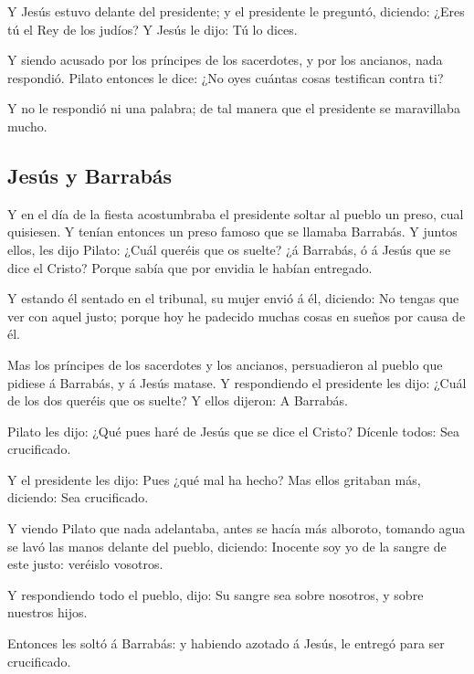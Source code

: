  Y Jesús estuvo delante del presidente; y el presidente le
preguntó, diciendo: ¿Eres tú el Rey de los judíos? Y Jesús le dijo: Tú
lo dices.

 Y siendo acusado por los príncipes de los sacerdotes, y
por los ancianos, nada respondió.  Pilato entonces le dice:
¿No oyes cuántas cosas testifican contra ti?

 Y no le respondió ni una palabra; de tal manera que el
presidente se maravillaba mucho.

\hypertarget{jesuxfas-y-barrabuxe1s}{%
\subsection{Jesús y Barrabás}\label{jesuxfas-y-barrabuxe1s}}

 Y en el día de la fiesta acostumbraba el presidente soltar
al pueblo un preso, cual quisiesen.  Y tenían entonces un
preso famoso que se llamaba Barrabás.  Y juntos ellos, les
dijo Pilato: ¿Cuál queréis que os suelte? ¿á Barrabás, ó á Jesús que se
dice el Cristo?  Porque sabía que por envidia le habían
entregado.

 Y estando él sentado en el tribunal, su mujer envió á él,
diciendo: No tengas que ver con aquel justo; porque hoy he padecido
muchas cosas en sueños por causa de él.

 Mas los príncipes de los sacerdotes y los ancianos,
persuadieron al pueblo que pidiese á Barrabás, y á Jesús matase.
 Y respondiendo el presidente les dijo: ¿Cuál de los dos
queréis que os suelte? Y ellos dijeron: A Barrabás.

 Pilato les dijo: ¿Qué pues haré de Jesús que se dice el
Cristo? Dícenle todos: Sea crucificado.

 Y el presidente les dijo: Pues ¿qué mal ha hecho? Mas
ellos gritaban más, diciendo: Sea crucificado.

 Y viendo Pilato que nada adelantaba, antes se hacía más
alboroto, tomando agua se lavó las manos delante del pueblo, diciendo:
Inocente soy yo de la sangre de este justo: veréislo vosotros.

 Y respondiendo todo el pueblo, dijo: Su sangre sea sobre
nosotros, y sobre nuestros hijos.

 Entonces les soltó á Barrabás: y habiendo azotado á Jesús,
le entregó para ser crucificado.

